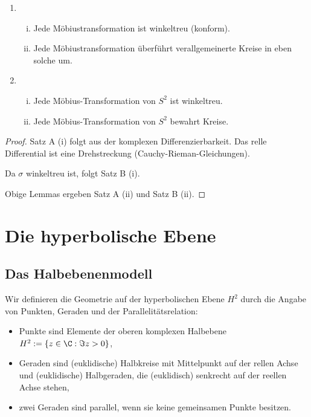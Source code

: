 \begin{st}
	\begin{enumerate}[A:]
		\item
			\begin{enumerate}[(i)]
				\item
					Jede Möbiustransformation ist winkeltreu (konform).
				\item
					Jede Möbiustransformation überführt verallgemeinerte Kreise in eben solche um.
			\end{enumerate}
		\item
			\begin{enumerate}[(i)]
				\item
					Jede Möbius-Transformation von $S^2$ ist winkeltreu.
				\item
					Jede Möbius-Transformation von $S^2$ bewahrt Kreise.
			\end{enumerate}
	\end{enumerate}
	\begin{proof}
		Satz A (i) folgt aus der komplexen Differenzierbarkeit.
		Das relle Differential ist eine Drehstreckung (Cauchy-Rieman-Gleichungen).

		Da $\sigma$ winkeltreu ist, folgt Satz B (i).

		Obige Lemmas ergeben Satz A (ii) und Satz B (ii).
	\end{proof}
\end{st}


\section{Die hyperbolische Ebene}

\subsection{Das Halbebenenmodell}

Wir definieren die Geometrie auf der hyperbolischen Ebene $H^2$ durch die Angabe von Punkten, Geraden und der Parallelitätsrelation:
\begin{itemize}
	\item
		Punkte sind Elemente der oberen komplexen Halbebene $H^2 := \{ z \in \C : \Im z > 0 \}$,
	\item
		Geraden sind (euklidische) Halbkreise mit Mittelpunkt auf der rellen Achse und (euklidische) Halbgeraden, die (euklidisch) senkrecht auf der reellen Achse stehen,
	\item
		zwei Geraden sind parallel, wenn sie keine gemeinsamen Punkte besitzen.
\end{itemize}

